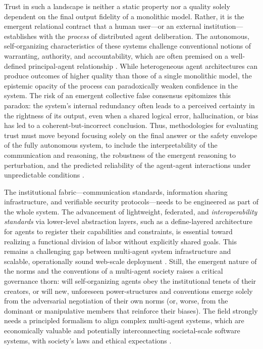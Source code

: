 \documentclass[11pt,a4paper]{article}
\begin{document}
Trust in such a landscape is neither a static property nor a quality solely dependent on the final output fidelity of a monolithic model. Rather, it is the emergent relational contract that a human user---or an external institution---establishes with the \emph{process} of distributed agent deliberation. The autonomous, self-organizing characteristics of these systems challenge conventional notions of warranting, authority, and accountability, which are often premised on a well-defined principal-agent relationship \cite{arxiv:2408.02920v1,arxiv:2409.11393v1}. While heterogeneous agent architectures can produce outcomes of higher quality than those of a single monolithic model, the epistemic opacity of the process can paradoxically weaken confidence in the system. The risk of an emergent collective false consensus epitomizes this paradox: the system's internal redundancy often leads to a perceived certainty in the rightness of its output, even when a shared logical error, hallucination, or bias has led to a coherent-but-incorrect conclusion. Thus, methodologies for evaluating trust must move beyond focusing solely on the final answer or the safety envelope of the fully autonomous system, to include the interpretability of the communication and reasoning, the robustness of the emergent reasoning to perturbation, and the predicted reliability of the agent-agent interactions under unpredictable conditions \cite{arxiv:2311.13148v3}.

The institutional fabric---communication standards, information sharing infrastructure, and verifiable security protocols---needs to be engineered as part of the whole system. The advancement of lightweight, federated, and \emph{interoperability standards} via lower-level abstraction layers, such as a define-layered architecture for agents to register their capabilities and constraints, is essential toward realizing a functional division of labor without explicitly shared goals. This remains a challenging gap between multi-agent system infrastructure and scalable, operationally sound web-scale deployment \cite{arxiv:2006.05619v1}. Still, the emergent nature of the norms and the conventions of a multi-agent society raises a critical governance thorn: will self-organizing agents obey the institutional tenets of their creators, or will new, unforeseen power-structures and conventions emerge solely from the adversarial negotiation of their own norms (or, worse, from the dominant or manipulative members that reinforce their biases). The field strongly needs a principled formalism to align complex multi-agent systems, which are economically valuable and potentially interconnecting societal-scale software systems, with society's laws and ethical expectations \cite{arxiv:2311.13148v3}.
\end{document}
